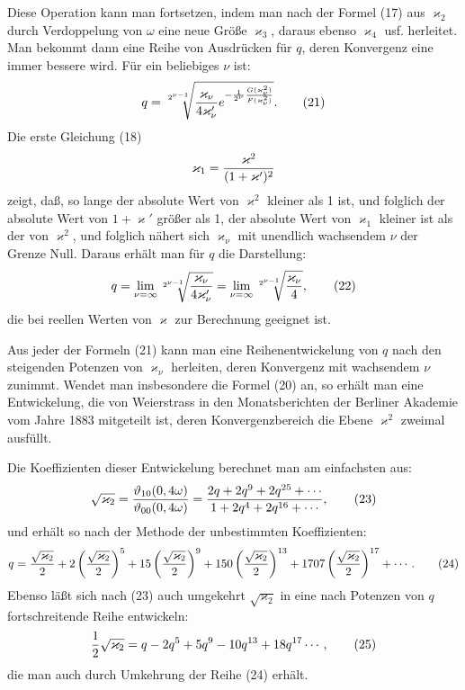 \documentclass[11pt]{article}
\providecommand{\tht}{\vartheta}
\begin{document}
Diese Operation kann man fortsetzen, indem man nach der Formel (17) aus $\varkappa_2$ durch Verdoppelung von $\omega$ eine neue Größe $\varkappa_3$, daraus ebenso $\varkappa_4$ usf. herleitet. Man bekommt dann eine Reihe von Ausdrücken für $q$, deren Konvergenz eine immer bessere wird. Für ein beliebiges $\nu$ ist:
\begin{equation}
q=\sqrt[2^{\nu-1}]{ {\varkappa_\nu\over4\varkappa_\nu'}
 e^{-{1\over2^\nu}{G(\varkappa_\nu^2)\over F(\varkappa_\nu^2)}} }.
\tag{21}
\end{equation}
Die erste Gleichung (18)
\[
\varkappa_1={\varkappa^2\over(1+\varkappa')^2}
\]
zeigt, daß, so lange der absolute Wert von $\varkappa^2$ kleiner als 1 ist, und folglich der absolute Wert von $1+\varkappa'$ größer als 1, der absolute Wert von $\varkappa_1$ kleiner ist als der von $\varkappa^2$, und folglich nähert sich $\varkappa_\nu$ mit unendlich wachsendem $\nu$ der Grenze Null. Daraus erhält man für $q$ die Darstellung:
\begin{equation}
q=\lim_{\nu=\infty}\sqrt[2^{\nu-1}]{ {\varkappa_\nu\over4\varkappa_\nu'} }
=\lim_{\nu=\infty}\sqrt[2^{\nu-1}]{ {\varkappa_\nu\over4} },
\tag{22}
\end{equation}
die bei reellen Werten von $\varkappa$ zur Berechnung geeignet ist.

Aus jeder der Formeln (21) kann man eine Reihenentwickelung von $q$ nach den steigenden Potenzen von $\varkappa_\nu$ herleiten, deren Konvergenz mit wachsendem $\nu$ zunimmt. Wendet man insbesondere die Formel (20) an, so erhält man eine Entwickelung, die von Weierstrass in den Monatsberichten der Berliner Akademie vom Jahre 1883 mitgeteilt ist, deren Konvergenzbereich die Ebene $\varkappa^2$ zweimal ausfüllt.

Die Koeffizienten dieser Entwickelung berechnet man am einfachsten aus:
\begin{equation}
\sqrt{\varkappa_2}={\tht_{10}(0,4\omega)\over\tht_{00}(0,4\omega)}
={2q+2q^9+2q^{25}+\cdots\over1+2q^4+2q^{16}+\cdots},
\tag{23}
\end{equation}
und erhält so nach der Methode der unbestimmten Koeffizienten:
\begin{equation}
q={\sqrt{\varkappa_2}\over2}
+2\left({\sqrt{\varkappa_2}\over2}\right)^5
+15\left({\sqrt{\varkappa_2}\over2}\right)^9
+150\left({\sqrt{\varkappa_2}\over2}\right)^{13}
+1707\left({\sqrt{\varkappa_2}\over2}\right)^{17}+\cdots.
\tag{24}
\end{equation}
Ebenso läßt sich nach (23) auch umgekehrt $\sqrt{\varkappa_2}$ in eine nach Potenzen von $q$ fortschreitende Reihe entwickeln:
\begin{equation}
{1\over2}\sqrt{\varkappa_2}=q-2q^5+5q^9-10q^{13}+18q^{17}\cdots,
\tag{25}
\end{equation}
die man auch durch Umkehrung der Reihe (24) erhält.
\end{document}
